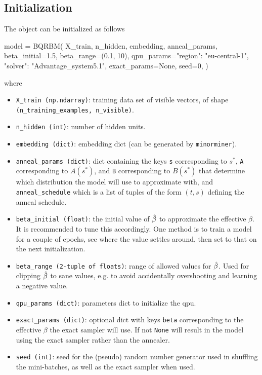 \subsection{Initialization}
The object can be initialized as follows
\begin{python}
model = BQRBM(
    X_train,
    n_hidden,
    embedding,
    anneal_params,
    beta_initial=1.5,
    beta_range=(0.1, 10),
    qpu_params={"region": "eu-central-1", "solver": "Advantage_system5.1"},
    exact_params=None,
    seed=0,
)
\end{python}
where
\begin{itemize}
    \item \texttt{X\_train (np.ndarray)}: training data set of visible vectors, of shape \newline\texttt{(n\_training\_examples, n\_visible)}.
    \item \texttt{n\_hidden (int)}: number of hidden units.
    \item \texttt{embedding (dict)}: embedding dict (can be generated by \texttt{minorminer}).
    \item \texttt{anneal\_params (dict)}: dict containing the keys \texttt{s} corresponding to \( s^* \), \texttt{A} corresponding to \( A(s^*) \), and \texttt{B} corresponding to \( B(s^*) \) that determine which distribution the model will use to approximate with, and \texttt{anneal\_schedule} which is a list of tuples of the form \( (t, s) \) defining the anneal schedule.
    \item \texttt{beta\_initial (float)}: the initial value of \( \hat{\beta} \) to approximate the effective \( \beta \). It is recommended to tune this accordingly. One method is to train a model for a couple of epochs, see where the value settles around, then set to that on the next initialization.
    \item \texttt{beta\_range (2-tuple of floats)}: range of allowed values for \( \hat{\beta} \). Used for clipping \( \hat{\beta} \) to sane values, e.g. to avoid accidentally overshooting and learning a negative value.
    \item \texttt{qpu\_params (dict)}: parameters dict to initialize the qpu.
    \item \texttt{exact\_params (dict)}: optional dict with keys \texttt{beta} corresponding to the effective \( \beta \) the exact sampler will use. If not \texttt{None} will result in the model using the exact sampler rather than the annealer.
    \item \texttt{seed (int)}: seed for the (pseudo) random number generator used in shuffling the mini-batches, as well as the exact sampler when used.
\end{itemize}

